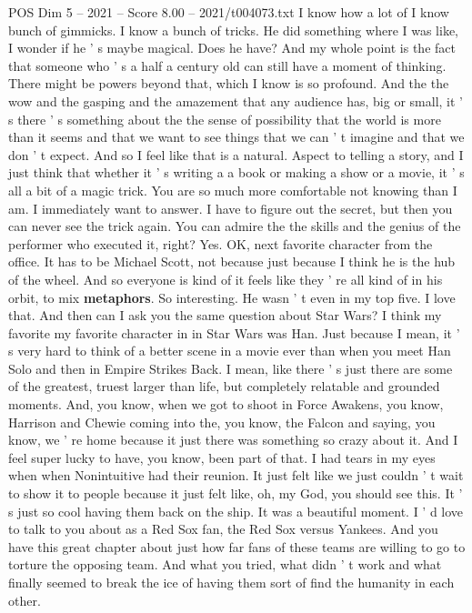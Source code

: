 \begin{textsample}{POS Dim 5 – 2021 – Score 8.00 – 2021/t004073.txt}
I know how a lot of I know bunch of gimmicks.
I know a bunch of tricks.
He did something where I was like, I wonder if he ' s maybe magical.
Does he have?
And my whole point is the fact that someone who ' s a half a century old can still have a moment of thinking.
There might be powers beyond that, which I know is so profound.
And the the wow and the gasping and the amazement that any audience has, big or small, it ' s there ' s something about the the sense of possibility that the world is more than it seems and that we want to see things that we can ' t imagine and that we don ' t expect.
And so I feel like that is a natural.
Aspect to telling a story, and I just think that whether it ' s writing a a book or making a show or a movie, it ' s all a bit of a magic trick.
You are so much more comfortable not knowing than I am.
I immediately want to answer.
I have to figure out the secret, but then you can never see the trick again.
You can admire the the skills and the genius of the performer who executed it, right?
Yes.
OK, next favorite character from the office.
It has to be Michael Scott, not because just because I think he is the hub of the wheel.
And so everyone is kind of it feels like they ' re all kind of in his orbit, to mix \textbf{metaphors}.
So interesting.
He wasn ' t even in my top five.
I love that.
And then can I ask you the same question about Star Wars?
I think my favorite my favorite character in in Star Wars was Han.
Just because I mean, it ' s very hard to think of a better scene in a movie ever than when you meet Han Solo and then in Empire Strikes Back.
I mean, like there ' s just there are some of the greatest, truest larger than life, but completely relatable and grounded moments.
And, you know, when we got to shoot in Force Awakens, you know, Harrison and Chewie coming into the, you know, the Falcon and saying, you know, we ' re home because it just there was something so crazy about it.
And I feel super lucky to have, you know, been part of that.
I had tears in my eyes when when Nonintuitive had their reunion.
It just felt like we just couldn ' t wait to show it to people because it just felt like, oh, my God, you should see this.
It ' s just so cool having them back on the ship.
It was a beautiful moment.
I ' d love to talk to you about as a Red Sox fan, the Red Sox versus Yankees.
And you have this great chapter about just how far fans of these teams are willing to go to torture the opposing team.
And what you tried, what didn ' t work and what finally seemed to break the ice of having them sort of find the humanity in each other.

\end{textsample}

